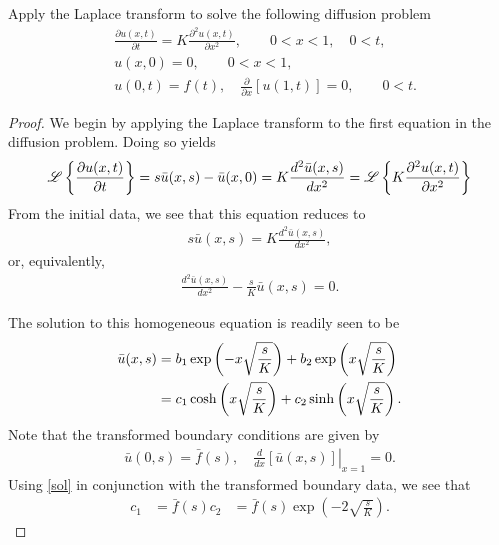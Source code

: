 \begin{problem}{6}
  Apply the Laplace transform to solve the following diffusion problem
  \begin{align*}
    & \frac{\partial u(x, t)}{\partial t} = K \frac{\partial^2 u(x, t) }{\partial x^2}, \qquad 0 < x < 1, \quad 0 < t, \\
    & u(x, 0) = 0, \qquad 0 < x < 1, \\
    & u(0, t) = f(t), \quad \frac{\partial }{\partial x}\left[u(1, t)\right] = 0, \qquad 0 < t.
  \end{align*}
\end{problem}

\begin{proof}
  We begin by applying the Laplace transform to the first equation in the diffusion problem.
  Doing so yields
  \begin{align*}
    \mathscr{L}\left\{ {\frac{\partial u(x, t)}{\partial t}} \right\} = s\bar{u}(x,s) - \bar{u}(x, 0) = K\frac{d^2\bar{u}(x, s)}{dx^2} = \mathscr{L}\left\{ {K \frac{\partial^2 u(x, t) }{\partial x^2}} \right\}
  \end{align*}
  From the initial data, we see that this equation reduces to
  \begin{align*}
    s\bar{u}(x,s) = K\frac{d^2\bar{u}(x, s)}{dx^2},
  \end{align*}
  or, equivalently,
  \begin{align*}
    \frac{d^2\bar{u}(x, s)}{dx^2}-\frac{s}{K}\bar{u}(x,s) =0.
  \end{align*}

  The solution to this homogeneous equation is readily seen to be
  \begin{align}\label{sol}
    \bar{u}(x, s) &= b_1 \exp\left(-x\sqrt{\frac{s}{K}}\right) + b_2 \exp\left(x\sqrt{\frac{s}{K}}\right) \notag \\
    &= c_1 \cosh\left(x\sqrt{\frac{s}{K}}\right) + c_2 \sinh\left(x\sqrt{\frac{s}{K}}\right).
  \end{align}
  Note that the transformed boundary conditions are given by
  \begin{align*}
    \bar{u}(0, s) = \bar{f}(s), \quad \left.\frac{d}{dx}\left[\bar{u}(x, s)\right]\right\rvert_{x=1} = 0.
  \end{align*}
  Using \eqref{sol} in conjunction with the transformed boundary data, we see that
  \begin{align*}
    c_1 &= \bar{f}(s)
    c_2 &= \bar{f}(s) \exp\left(-2\sqrt{\frac{s}{K}}\right).
  \end{align*}


\end{proof}
